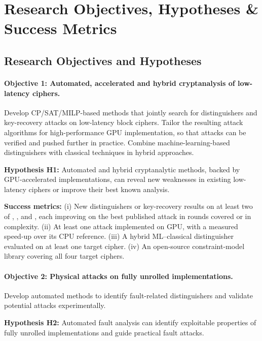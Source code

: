 \section{Research Objectives, Hypotheses \& Success Metrics}

\subsection{Research Objectives and Hypotheses}

\paragraph{Objective 1: Automated, accelerated and hybrid cryptanalysis of low-latency ciphers.}
Develop CP/SAT/MILP-based methods that jointly search for distinguishers and key-recovery attacks on low-latency block ciphers.
Tailor the resulting attack algorithms for high-performance GPU implementation, so that attacks can be verified and pushed further in practice.
Combine machine-learning-based distinguishers with classical techniques in hybrid approaches.

\textbf{Hypothesis H1:}
Automated and hybrid cryptanalytic methods, backed by GPU-accelerated implementations, can reveal new weaknesses in existing low-latency ciphers or improve their best known analysis.

\textbf{Success metrics:}
(i) New distinguishers or key-recovery results on at least two of , ,  and , each improving on the best published attack in rounds covered or in complexity.
(ii) At least one attack implemented on GPU, with a measured speed-up over its CPU reference.
(iii) A hybrid ML--classical distinguisher evaluated on at least one target cipher.
(iv) An open-source constraint-model library covering all four target ciphers.

\paragraph{Objective 2: Physical attacks on fully unrolled
implementations.}
Develop automated methods to identify fault-related distinguishers
and validate potential attacks experimentally.

\textbf{Hypothesis H2:}
Automated fault analysis can identify exploitable properties
of fully unrolled implementations and guide practical fault attacks.


